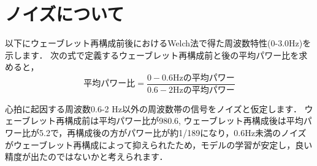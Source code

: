 \documentclass[dvipdfmx]{jsarticle}
\begin{document}
\title{}
\author{権藤陸}
\maketitle

\section*{ノイズについて}

以下にウェーブレット再構成前後におけるWelch法で得た周波数特性(0-3.0Hz)を示します．
次の式で定義するウェーブレット再構成前と後の平均パワー比を求めると，
\begin{equation}\label{}
平均パワー比 = \frac{0-0.6 \mathrm{Hz}の平均パワー}{0.6-2 \mathrm{Hz}の平均パワー}
\end{equation}

心拍に起因する周波数0.6-2 Hz以外の周波数帯の信号をノイズと仮定します．
ウェーブレット再構成前は平均パワー比が980.6, ウェーブレット再構成後は平均パワー比が5.2で，再構成後の方がパワー比が約1/189になり，0.6Hz未満のノイズがウェーブレット再構成によって抑えられたため，モデルの学習が安定し，良い精度が出たのではないかと考えられます．
\end{document}
